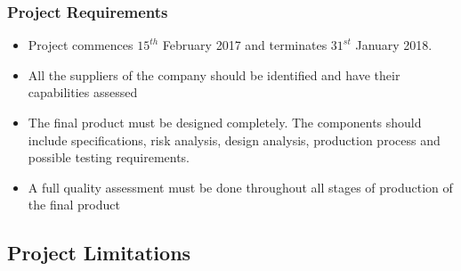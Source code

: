 \subsubsection{Project Requirements}

\begin{itemize}
\item Project commences $15^{th}$ February 2017 and terminates $31^{st}$ January 2018.
\item All the suppliers of the company should be identified and have their capabilities assessed 
\item The final product must be designed completely. The components should include specifications, risk analysis, design analysis, production process and possible testing requirements.
\item A full quality assessment must be done throughout all stages of production of the final product
\end{itemize}

\subsection{Project Limitations}

